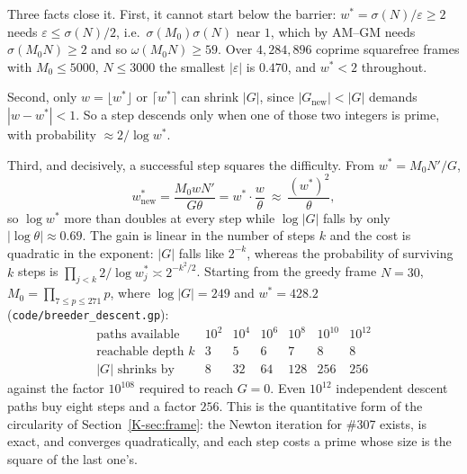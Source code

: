 \documentclass[11pt]{article}
\theoremstyle{definition}
\begin{document}
Three facts close it. First, it cannot start below the barrier: $w^{*}=\sigma(N)/\varepsilon\ge2$
needs $\varepsilon\le\sigma(N)/2$, i.e.\ $\sigma(M_0)\sigma(N)$ near $1$, which by AM--GM needs
$\sigma(M_0N)\ge2$ and so $\omega(M_0N)\ge59$. Over $4{,}284{,}896$ coprime squarefree frames with
$M_0\le5000$, $N\le3000$ the smallest $|\varepsilon|$ is $0.470$, and $w^{*}<2$ throughout.

Second, only $w=\lfloor w^{*}\rfloor$ or $\lceil w^{*}\rceil$ can shrink $|G|$, since
$|G_{\mathrm{new}}|<|G|$ demands $|w-w^{*}|<1$. So a step descends only when one of those two
integers is prime, with probability $\approx2/\log w^{*}$.

Third, and decisively, a successful step squares the difficulty. From $w^{*}=M_0N'/G$,
\[ w^{*}_{\mathrm{new}}=\frac{M_0wN'}{G\theta}=w^{*}\cdot\frac{w}{\theta}\ \approx\
   \frac{(w^{*})^{2}}{\theta}, \]
so $\log w^{*}$ more than doubles at every step while $\log|G|$ falls by only $|\log\theta|\approx
0.69$. The gain is linear in the number of steps $k$ and the cost is quadratic in the exponent:
$|G|$ falls like $2^{-k}$, whereas the probability of surviving $k$ steps is
$\prod_{j<k}2/\log w^{*}_j\asymp2^{-k^{2}/2}$. Starting from the greedy frame $N=30$,
$M_0=\prod_{7\le p\le271}p$, where $\log|G|=249$ and $w^{*}=428.2$
(\texttt{code/breeder\_descent.gp}):
\[
\begin{array}{l|cccccc}
\text{paths available} & 10^{2} & 10^{4} & 10^{6} & 10^{8} & 10^{10} & 10^{12}\\\hline
\text{reachable depth }k & 3 & 5 & 6 & 7 & 8 & 8\\
|G|\text{ shrinks by} & 8 & 32 & 64 & 128 & 256 & 256
\end{array}
\]
against the factor $10^{108}$ required to reach $G=0$. Even $10^{12}$ independent descent paths buy
eight steps and a factor $256$. This is the quantitative form of the circularity of
Section~\ref{K-sec:frame}: the Newton iteration for \#307 exists, is exact, and converges quadratically,
and each step costs a prime whose size is the square of the last one's.
\end{document}

